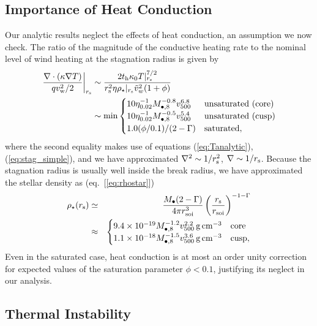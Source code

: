 \documentclass[usenatbib,fleqn]{mn2e}
\begin{document}
\subsection{Importance of Heat Conduction}

Our analytic results neglect the effects of heat conduction, an assumption we now check.  The ratio of the magnitude of the conductive heating rate to the nominal level of wind heating at the stagnation radius is given by
\begin{align}
  \left.\frac{\nabla\cdot(\kappa \nabla T)}{q v_{\rm
w}^{2}/2}\right|_{r_{\rm s}} &\sim \frac{2t_{\rm h}\kappa_0
T|_{r_{\rm s}}^{7/2}}{r_{\rm s}^{2}\eta \rho_{\star}|_{r_{\rm s}} \tilde{v}_{w}^{2}(1+\phi)}
\nonumber \\ &\sim {\rm min}
  \begin{cases}
  10 \eta_{0.02}^{-1}
M_{\bullet,8}^{-0.8} v_{500}^{6.8} &  \text{unsaturated (core)}\\
 10 \eta_{0.02}^{-1}
M_{\bullet,8}^{-0.5} v_{500}^{5.4} &  \text{unsaturated (cusp)}\\
  1.0(\phi/0.1)/(2-\Gamma) & \text{saturated},
  \end{cases}
 \label{eq:rhors}
\end{align}
where the second equality makes use of equations (\ref{eq:Tanalytic}), (\ref{eq:stag_simple}), and we have approximated $\nabla^{2} \sim 1/r_{\rm s}^{2}$, $\nabla \sim 1/r_{\rm s}$.  Because the stagnation radius is usually well inside the break radius, we have approximated the stellar density as (eq.~[\ref{eq:rhostar}])
\begin{eqnarray}
  \rho_{\star}(r_{\rm s}) &\simeq& \frac{M_{\bullet}(2-\Gamma)}{4\pi r_{\rm soi}^{3}}\left(\frac{r_{\rm s}}{r_{\rm soi}}\right)^{-1-\Gamma} \nonumber \\
 &\approx& \begin{cases}
    9.4 \times 10^{-19}M_{\bullet,8}^{-1.2}v_{500}^{2.2}\,{\rm g\,cm^{-3}}
    & \text{core} \\
    1.1 \times 10^{-18} M_{\bullet,8}^{-1.5}v_{500}^{3.6}
    \,{\rm g\,cm^{-3}}  & \text{cusp}, 
  \end{cases}
  \label{eq:rhostarrs}
\end{eqnarray}
Even in the saturated case, heat conduction is at most an order unity correction for expected values of the saturation parameter $\phi < 0.1$, justifying its neglect in our analysis.  

\subsection{Thermal Instability}
\label{sec:instability}
\end{document}
